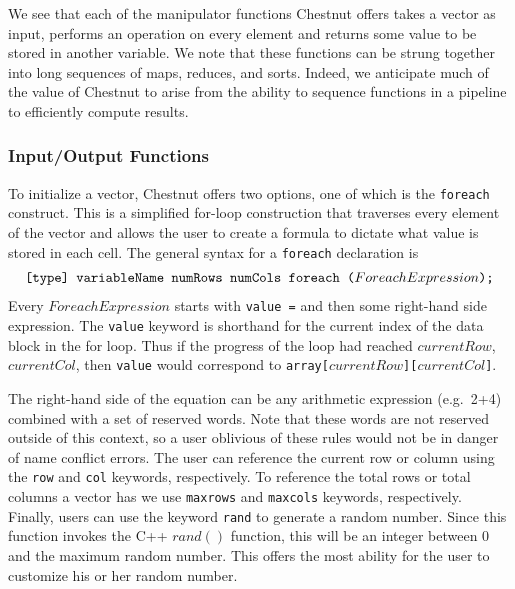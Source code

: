 \documentclass[twocolumn]{article}
\renewcommand{\|}{\origbar} %
\newcommand{\code}[1]{\texttt{#1}}
\begin{document}
We see that each of the manipulator functions Chestnut offers takes a vector as input, performs an operation on every element and returns some value to be stored in another variable. We note that these functions can be strung together into long sequences of maps, reduces, and sorts. Indeed, we anticipate much of the value of Chestnut to arise from the ability to sequence functions in a pipeline to efficiently compute results.

\subsubsection{Input/Output Functions}
\label{sec:iofunctions}

To initialize a vector, Chestnut offers two options, one of which is the \code{foreach} construct. This is a simplified for-loop construction that traverses every element of the vector and allows the user to create a formula to dictate what value is stored in each cell. The general syntax for a \code{foreach} declaration is
\begin{align*}
  \if@twocolumn
    \code{[type]}& \code{ variableName numRows numCols } \\ &\code{foreach ($ForeachExpression$);}
  \else
    \code{[type] variableName numRows numCols foreach ($ForeachExpression$);}
  \fi
\end{align*}
Every $ForeachExpression$ starts with \code{value =} and then some right-hand side expression. The \code{value} keyword is shorthand for the current index of the data block in the for loop. Thus if the progress of the loop had reached $currentRow$, $currentCol$, then \code{value} would correspond to \code{array[$currentRow$][$currentCol$]}.

The right-hand side of the equation can be any arithmetic expression (e.g.\ 2+4) combined with a set of reserved words. Note that these words are not reserved outside of this context, so a user oblivious of these rules would not be in danger of name conflict errors. The user can reference the current row or column using the \code{row} and \code{col} keywords, respectively. To reference the total rows or total columns a vector has we use \code{maxrows} and \code{maxcols} keywords, respectively. Finally, users can use the keyword \code{rand} to generate a random number. Since this function invokes the C++ $rand()$ function, this will be an integer between 0 and the maximum random number. This offers the most ability for the user to customize his or her random number. 
\end{document}
